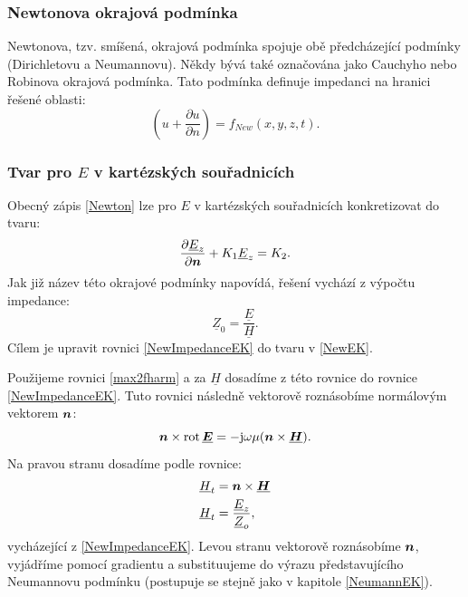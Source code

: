 \documentclass[12pt,a4paper,oneside]{article}
\numberwithin{equation}{section} %
\numberwithin{figure}{section} %
\numberwithin{table}{section} %
\newcommand{\mj}{\mathrm{j}} %
\renewcommand{\vec}[1]{\mbox{\boldmath$#1$}} %
\newcommand{\faz}[1]{{\underline{#1}}} %
\newcommand{\rot}{\mathrm{rot}\ }
\begin{document}
\subsubsection{Newtonova okrajová podmínka}
Newtonova, tzv. smíšená, okrajová podmínka spojuje obě předcházející podmínky (Dirichletovu a Neumannovu). Někdy bývá také označována jako Cauchyho nebo Robinova okrajová podmínka. Tato podmínka definuje impedanci na hranici řešené oblasti:
\begin{equation}
\label{Newton}
\left( u + \frac{\partial u}{\partial n} \right) = f _{New} (x, y, z, t) .
\end{equation}  


\subsubsection*{Tvar pro \faz{\vec{E}} v kartézských souřadnicích}
Obecný zápis \ref{Newton} lze pro \faz{\vec{E}} v kartézských souřadnicích konkretizovat do tvaru:
\begin{equation}
\label{NewEK}
\frac{\partial \faz{E} _z}{\partial \vec{n}} + K_1 \faz{E} _z = K_2 .
\end{equation}
Jak již název této okrajové podmínky napovídá, řešení vychází z výpočtu impedance: 
\begin{equation}
\label{NewImpedanceEK}
\faz{Z} _0 = \frac{\faz{E}}{\faz{H}} .
\end{equation}
Cílem je upravit rovnici \ref{NewImpedanceEK} do tvaru v \ref{NewEK}.

Použijeme rovnici \ref{max2fharm} a za $\faz{H}$ dosadíme z této rovnice do rovnice \ref{NewImpedanceEK}. Tuto rovnici následně vektorově roznásobíme normálovým vektorem $\vec{n}$:
\begin{equation}
\vec{n} \times \rot \! \faz{\vec{E}} = - \mj \omega \mu (\vec{n} \times \faz{\vec{H}}) .
\end{equation}
Na pravou stranu dosadíme podle rovnice:
\begin{subequations}
\begin{align}
\faz{H} _t &= \vec{n} \times \faz{\vec{H}}
\\
\faz{H} _t &= \frac{\faz{E} _z}{\faz{Z} _o} ,
\end{align}
\end{subequations}
vycházející z \ref{NewImpedanceEK}. Levou stranu vektorově roznásobíme $\vec{n}$, vyjádříme pomocí gradientu a substituujeme do výrazu představujícího Neumannovu podmínku (postupuje se stejně jako v kapitole \ref{NeumannEK}).
\end{document}
